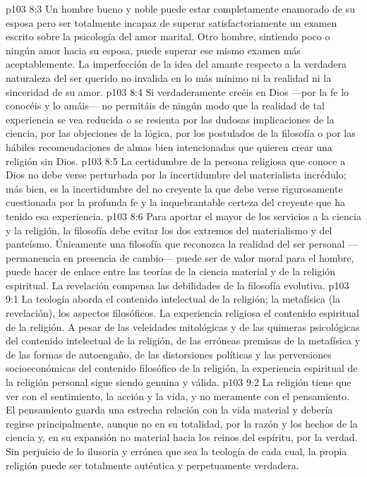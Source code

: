 \vs p103 8:3 Un hombre bueno y noble puede estar completamente enamorado de su esposa pero ser totalmente incapaz de superar satisfactoriamente un examen escrito sobre la psicología del amor marital. Otro hombre, sintiendo poco o ningún amor hacia su esposa, puede superar ese mismo examen más aceptablemente. La imperfección de la idea del amante respecto a la verdadera naturaleza del ser querido no invalida en lo más mínimo ni la realidad ni la sinceridad de su amor.
\vs p103 8:4 \pc Si verdaderamente creéis en Dios ---por la fe lo conocéis y lo amáis--- no permitáis de ningún modo que la realidad de tal experiencia se vea reducida o se resienta por las dudosas implicaciones de la ciencia, por las objeciones de la lógica, por los postulados de la filosofía o por las hábiles recomendaciones de almas bien intencionadas que quieren crear una religión sin Dios.
\vs p103 8:5 La certidumbre de la persona religiosa que conoce a Dios no debe verse perturbada por la incertidumbre del materialista incrédulo; más bien, es la incertidumbre del no creyente la que debe verse rigurosamente cuestionada por la profunda fe y la inquebrantable certeza del creyente que ha tenido esa experiencia.
\vs p103 8:6 \pc Para aportar el mayor de los servicios a la ciencia y la religión, la filosofía debe evitar los dos extremos del materialismo y del panteísmo. Únicamente una filosofía que reconozca la realidad del ser personal ---permanencia en presencia de cambio--- puede ser de valor moral para el hombre, puede hacer de enlace entre las teorías de la ciencia material y de la religión espiritual. La revelación compensa las debilidades de la filosofía evolutiva.
\vs p103 9:1 La teología aborda el contenido intelectual de la religión; la metafísica (la revelación), los aspectos filosóficos. La experiencia religiosa  el contenido espiritual de la religión. A pesar de las veleidades mitológicas y de las quimeras psicológicas del contenido intelectual de la religión, de las erróneas premisas de la metafísica y de las formas de autoengaño, de las distorsiones políticas y las perversiones socioeconómicas del contenido filosófico de la religión, la experiencia espiritual de la religión personal sigue siendo genuina y válida.
\vs p103 9:2 La religión tiene que ver con el sentimiento, la acción y la vida, y no meramente con el pensamiento. El pensamiento guarda una estrecha relación con la vida material y debería regirse principalmente, aunque no en su totalidad, por la razón y los hechos de la ciencia y, en su expansión no material hacia los reinos del espíritu, por la verdad. Sin perjuicio de lo ilusoria y errónea que sea la teología de cada cual, la propia religión puede ser totalmente auténtica y perpetuamente verdadera.
